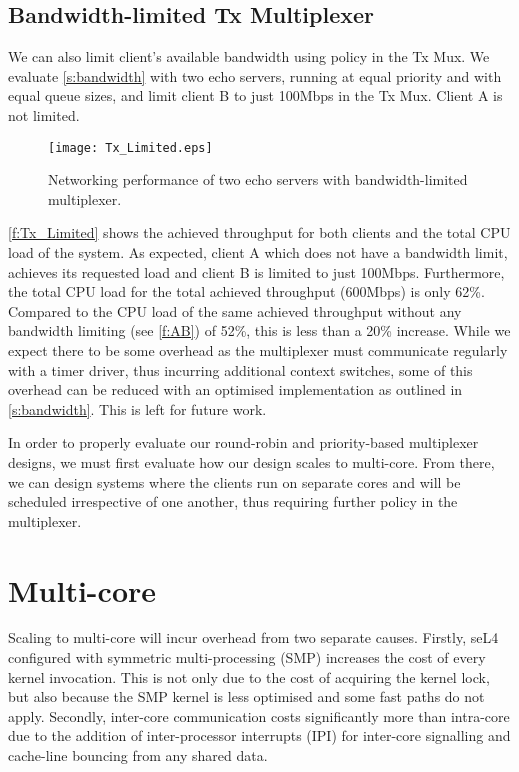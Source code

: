 \subsection{Bandwidth-limited Tx Multiplexer}

We can also limit client's available bandwidth using policy in the Tx Mux. We evaluate \autoref{s:bandwidth} with two echo servers,
running at equal priority and with equal queue sizes, and limit client B to just 100Mbps in the Tx Mux. Client A is not limited.

\begin{figure}[H]
    \centering
    \texttt{[image: Tx\_Limited.eps]}
    \caption{Networking performance of two echo servers with bandwidth-limited multiplexer.}
    \label{f:Tx_Limited}
\end{figure}

\autoref{f:Tx_Limited} shows the achieved throughput for both clients and the total CPU load of the system. As expected, 
client A which does not have a bandwidth limit, achieves its requested load and client B is limited to just 100Mbps. Furthermore, 
the total CPU load for the total achieved throughput (600Mbps) is only 62\%. Compared to the CPU load of the same 
achieved throughput without any bandwidth limiting (see \autoref{f:AB}) of 52\%, this is less than a 20\% increase. While we
expect there to be some overhead as the multiplexer must communicate regularly with a timer driver, thus incurring additional
context switches, some of this overhead can be reduced with an optimised implementation 
as outlined in \autoref{s:bandwidth}. This is left for future work.

In order to properly evaluate our round-robin and priority-based multiplexer designs, we must first evaluate how our
design scales to multi-core. From there, we can design systems where the clients run on separate cores and will be scheduled irrespective
of one another, thus requiring further policy in the multiplexer.

\section{Multi-core}

Scaling to multi-core will incur overhead from two separate causes. Firstly, seL4 configured with symmetric multi-processing (SMP) increases
the cost of every kernel invocation. This is not only due to the cost of acquiring the kernel lock, but also because the SMP kernel is
less optimised and some fast paths do not apply. Secondly, inter-core communication costs significantly more than intra-core due to the addition of 
inter-processor interrupts (IPI) for inter-core signalling and cache-line bouncing from any shared data. \\

